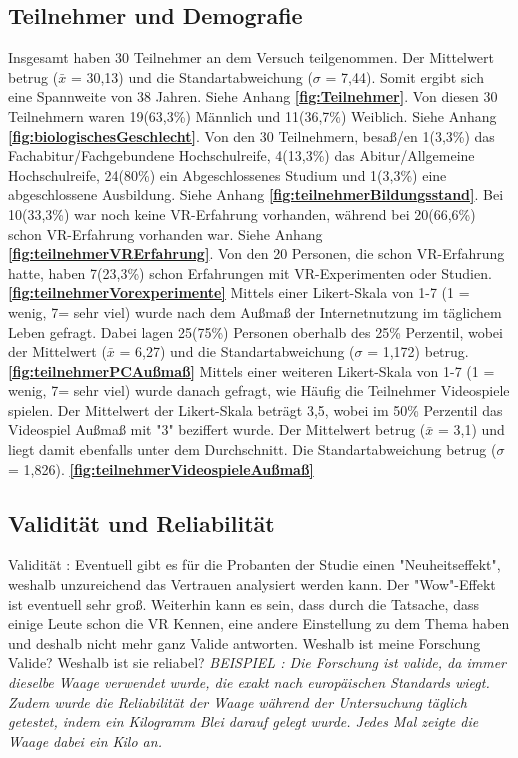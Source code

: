 \documentclass[a4paper,11pt]{article}%
\renewcommand{\\}{\vspace*{0.5\baselineskip} \newline}
\begin{document}
	\subsection{Teilnehmer und Demografie}
Insgesamt haben 30 Teilnehmer an dem Versuch teilgenommen. Der Mittelwert betrug ($\bar{x}$ = 30,13) und die Standartabweichung ($\sigma$ = 7,44). Somit ergibt sich eine Spannweite von 38 Jahren. Siehe Anhang \textbf{\autoref{fig:Teilnehmer}}.\\
Von diesen 30 Teilnehmern waren 19(63,3\%) Männlich und 11(36,7\%) Weiblich. Siehe Anhang \textbf{\autoref{fig:biologischesGeschlecht}}.\\
Von den 30 Teilnehmern, besaß/en 1(3,3\%) das Fachabitur/Fachgebundene Hochschulreife, 4(13,3\%) das Abitur/Allgemeine Hochschulreife, 24(80\%) ein Abgeschlossenes Studium und 1(3,3\%) eine abgeschlossene Ausbildung. Siehe Anhang \textbf{\autoref{fig:teilnehmerBildungsstand}}.\\
Bei 10(33,3\%) war noch keine VR-Erfahrung vorhanden, während bei 20(66,6\%) schon VR-Erfahrung vorhanden war. Siehe Anhang \textbf{\autoref{fig:teilnehmerVRErfahrung}}.\\ 
Von den 20 Personen, die schon VR-Erfahrung hatte, haben 7(23,3\%) schon Erfahrungen mit VR-Experimenten oder Studien. \textbf{\autoref{fig:teilnehmerVorexperimente}} \\
Mittels einer Likert-Skala von 1-7 (1 = wenig, 7= sehr viel) wurde nach dem Außmaß der Internetnutzung im täglichem Leben gefragt. Dabei lagen 25(75\%) Personen oberhalb des 25\% Perzentil, wobei der Mittelwert ($\bar{x}$ = 6,27) und die Standartabweichung ($\sigma$ = 1,172) betrug. \textbf{\autoref{fig:teilnehmerPCAußmaß}} \\ 
Mittels einer weiteren Likert-Skala von 1-7 (1 = wenig, 7= sehr viel) wurde danach gefragt, wie Häufig die Teilnehmer Videospiele spielen. Der Mittelwert der Likert-Skala beträgt 3,5, wobei im 50\% Perzentil das Videospiel Außmaß mit "3" beziffert wurde. Der Mittelwert betrug ($\bar{x}$ = 3,1) und liegt damit ebenfalls unter dem Durchschnitt. Die Standartabweichung betrug ($\sigma$ = 1,826). \textbf{\autoref{fig:teilnehmerVideospieleAußmaß}}

	
			\subsection{Validität und Reliabilität}
		Validität : Eventuell gibt es für die Probanten der Studie einen "Neuheitseffekt", weshalb unzureichend das Vertrauen analysiert werden kann. Der "Wow"-Effekt ist eventuell sehr groß. Weiterhin kann es sein, dass durch die Tatsache, dass einige Leute schon die VR Kennen, eine andere Einstellung zu dem Thema haben und deshalb nicht mehr ganz Valide antworten.
		Weshalb ist meine Forschung Valide? Weshalb ist sie reliabel?	
		\textit{BEISPIEL : Die Forschung ist valide, da immer dieselbe Waage verwendet wurde, die exakt nach europäischen Standards wiegt. Zudem wurde die Reliabilität der Waage während der Untersuchung täglich getestet, indem ein Kilogramm Blei darauf gelegt wurde. Jedes Mal zeigte die Waage dabei ein Kilo an.}
\end{document}
